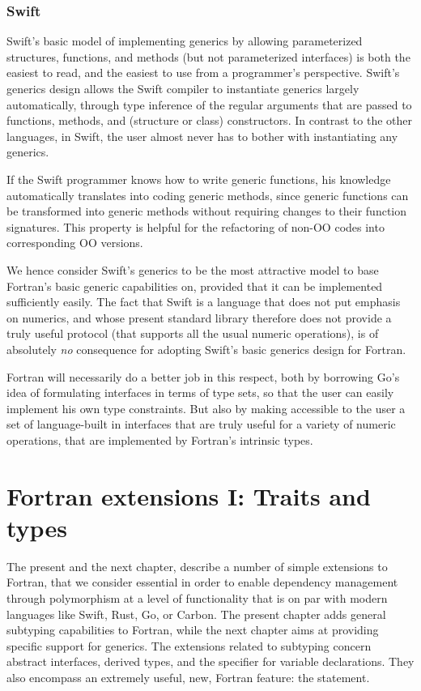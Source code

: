 \documentclass[11pt,oneside]{report}
\newcommand{\code}[1]{{\selectfont\ttfamily{#1}}}
\begin{document}
\subsection{Swift}

Swift's basic model of implementing generics by allowing parameterized
structures, functions, and methods (but not parameterized interfaces)
is both the easiest to read, and the easiest to use from a
programmer's perspective. Swift's generics design allows the Swift
compiler to instantiate generics largely automatically, through type
inference of the regular arguments that are passed to functions,
methods, and (structure or class) constructors. In contrast to the
other languages, in Swift, the user almost never has to bother with
instantiating any generics.

If the Swift programmer knows how to write generic functions, his
knowledge automatically translates into coding generic methods, since
generic functions can be transformed into generic methods without
requiring changes to their function signatures. This property is
helpful for the refactoring of non-OO codes into corresponding OO
versions.

We hence consider Swift's generics to be the most attractive model to
base Fortran's basic generic capabilities on, provided that it can be
implemented sufficiently easily. The fact that Swift is a language
that does not put emphasis on numerics, and whose present standard
library therefore does not provide a truly useful \code{Numeric}
protocol (that supports all the usual numeric operations), is of
absolutely \emph{no} consequence for adopting Swift's basic generics
design for Fortran.

Fortran will necessarily do a better job in this respect, both by
borrowing Go's idea of formulating interfaces in terms of type sets,
so that the user can easily implement his own type constraints. But
also by making accessible to the user a set of language-built in
interfaces that are truly useful for a variety of numeric operations,
that are implemented by Fortran's intrinsic types.


\chapter{Fortran extensions I: Traits and types}

The present and the next chapter, describe a number of simple
extensions to Fortran, that we consider essential in order to enable
dependency management through polymorphism at a level of functionality
that is on par with modern languages like Swift, Rust, Go, or
Carbon. The present chapter adds general subtyping capabilities to
Fortran, while the next chapter aims at providing specific support for
generics. The extensions related to subtyping concern abstract
interfaces, derived types, and the \code{class} specifier for variable
declarations. They also encompass an extremely useful, new, Fortran
feature: the \code{implements} statement.
\end{document}
